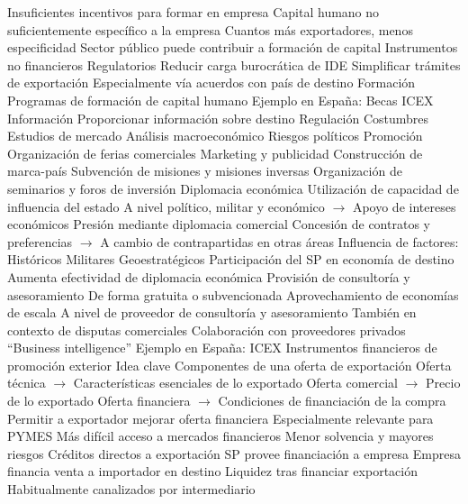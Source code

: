 \documentclass{nuevotema}
\begin{document}
\begin{esquemal}
				\4 Insuficientes incentivos para formar en empresa
				\4[] Capital humano no suficientemente específico a la empresa
				\4[] Cuantos más exportadores, menos especificidad
				\4 Sector público puede contribuir a formación de capital
		\2 Instrumentos no financieros
			\3 Regulatorios
				\4 Reducir carga burocrática de IDE
				\4 Simplificar trámites de exportación
				\4[] Especialmente vía acuerdos con país de destino
			\3 Formación
				\4 Programas de formación de capital humano
				\4 Ejemplo en España:
				\4[] Becas ICEX
			\3 Información
				\4 Proporcionar información sobre destino
				\4[] Regulación
				\4[] Costumbres
				\4[] Estudios de mercado
				\4[] Análisis macroeconómico
				\4[] Riesgos políticos
			\3 Promoción
				\4 Organización de ferias comerciales
				\4 Marketing y publicidad
				\4 Construcción de marca-país
				\4 Subvención de misiones y misiones inversas
				\4 Organización de seminarios y foros de inversión
			\3 Diplomacia económica
				\4 Utilización de capacidad de influencia del estado
				\4[] A nivel político, militar y económico
				\4[] $\to$ Apoyo de intereses económicos
				\4 Presión mediante diplomacia comercial
				\4[] Concesión de contratos y preferencias
				\4[] $\to$ A cambio de contrapartidas en otras áreas
				\4 Influencia de factores:
				\4[] Históricos
				\4[] Militares
				\4[] Geoestratégicos
				\4 Participación del SP en economía de destino
				\4[] Aumenta efectividad de diplomacia económica
			\3 Provisión de consultoría y asesoramiento
				\4 De forma gratuita o subvencionada
				\4 Aprovechamiento de economías de escala
				\4[] A nivel de proveedor de consultoría y asesoramiento
				\4 También en contexto de disputas comerciales
				\4 Colaboración con proveedores privados
				\4[] ``Business intelligence''
				\4 Ejemplo en España:
				\4[] ICEX
		\2 Instrumentos financieros de promoción exterior
			\3 Idea clave
				\4 Componentes de una oferta de exportación
				\4[] Oferta técnica
				\4[] $\to$ Características esenciales de lo exportado
				\4[] Oferta comercial
				\4[] $\to$ Precio de lo exportado
				\4[] Oferta financiera
				\4[] $\to$ Condiciones de financiación de la compra
				\4 Permitir a exportador mejorar oferta financiera
				\4 Especialmente relevante para PYMES
				\4[] Más difícil acceso a mercados financieros
				\4[] Menor solvencia y mayores riesgos
			\3 Créditos directos a exportación
				\4 SP provee financiación a empresa
				\4 Empresa financia venta a importador en destino
				\4 Liquidez tras financiar exportación
				\4 Habitualmente canalizados por intermediario

\end{esquemal}
\end{document}
